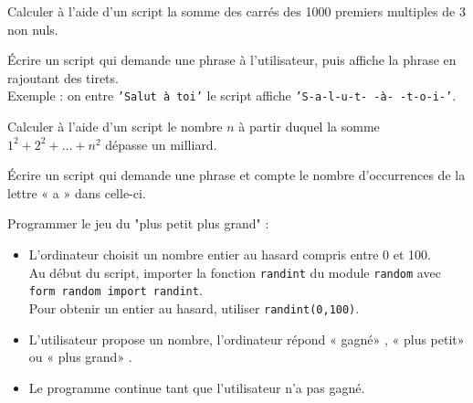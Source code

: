 \begin{exercice}
    Calculer à l'aide d'un script la somme des carrés des 1000 premiers multiples de 3 non nuls.
\end{exercice}

\begin{exercice}
    \'Ecrire un script qui demande une phrase à l'utilisateur, puis affiche la phrase en rajoutant des tirets.\\
    Exemple : on entre \texttt{'Salut à toi'} le script affiche \texttt{'S-a-l-u-t- -à- -t-o-i-'}.
\end{exercice}

\begin{exercice}
    Calculer à l'aide d'un script le nombre $n$ à partir duquel la somme $1^2+2^2+\ldots+n^2$ dépasse un milliard.
\end{exercice}

\begin{exercice}
    \'Ecrire un script qui demande une phrase et compte le nombre d'occurrences de la lettre « a »  dans celle-ci.
\end{exercice}

\begin{exercice}
    Programmer le jeu du "plus petit plus grand" :
    \begin{itemize}
        \item   L'ordinateur choisit un nombre entier au hasard compris entre 0 et 100.\\
        Au début du script, importer la fonction \texttt{randint} du module \texttt{random} avec \texttt{form random import randint}.\\
        Pour obtenir un entier au hasard, utiliser \texttt{randint(0,100)}.
        \item   L'utilisateur propose un nombre, l'ordinateur répond « gagné» , « plus petit»  ou « plus grand» .
        \item   Le programme continue tant que l'utilisateur n'a pas gagné.
    \end{itemize}
\end{exercice}

